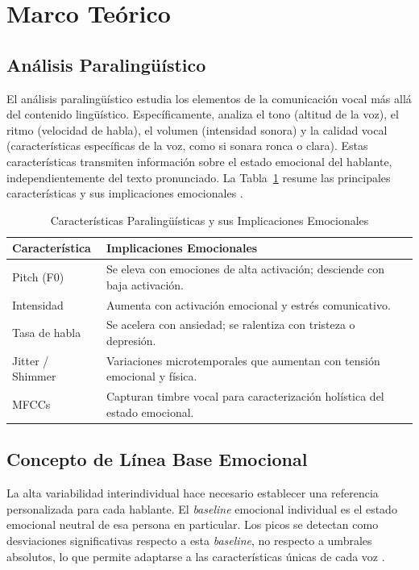 \section{Marco Teórico}

\subsection{Análisis Paralingüístico}

El análisis paralingüístico estudia los elementos de la comunicación vocal más allá
del contenido lingüístico. Específicamente, analiza el tono (altitud de la voz), el
ritmo (velocidad de habla), el volumen (intensidad sonora) y la calidad vocal
(características específicas de la voz, como si sonara ronca o clara). Estas
características transmiten información sobre el estado emocional del hablante,
independientemente del texto pronunciado. La Tabla~\ref{tab:paralinguistic} resume las
principales características y sus implicaciones emocionales \cite{jha2022, lian2023}.

\begin{table}[!t]
\renewcommand{\arraystretch}{1.3}
\caption{Características Paralingüísticas y sus Implicaciones Emocionales}
\label{tab:paralinguistic}
\centering
\begin{tabular}{p{2cm} p{5.5cm}}
\toprule
\textbf{Característica} & \textbf{Implicaciones Emocionales} \\
\midrule
Pitch (F0)        & Se eleva con emociones de alta activación; desciende con baja activación. \\
Intensidad        & Aumenta con activación emocional y estrés comunicativo. \\
Tasa de habla     & Se acelera con ansiedad; se ralentiza con tristeza o depresión. \\
Jitter / Shimmer  & Variaciones microtemporales que aumentan con tensión emocional y física. \\
MFCCs             & Capturan timbre vocal para caracterización holística del estado emocional. \\
\bottomrule
\end{tabular}
\end{table}

\subsection{Concepto de Línea Base Emocional}

La alta variabilidad interindividual hace necesario establecer una referencia
personalizada para cada hablante. El \textit{baseline} emocional individual es el
estado emocional neutral de esa persona en particular. Los picos se detectan como
desviaciones significativas respecto a esta \textit{baseline}, no respecto a umbrales
absolutos, lo que permite adaptarse a las características únicas de cada voz
\cite{gat2022}.

